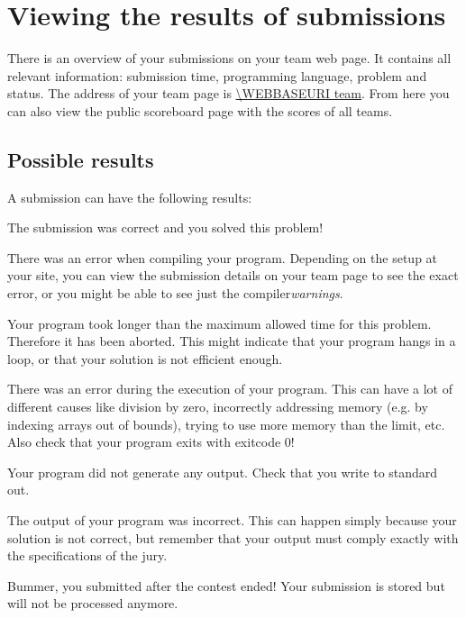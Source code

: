 \section{Viewing the results of submissions}

There is an overview of your submissions on your team web page.
It contains all relevant information: submission time, programming
language, problem and status. The address of your team page is
\url{\WEBBASEURI team}. From here you can also view the public
scoreboard page with the scores of all teams.

\subsection{Possible results}

A submission can have the following results:

\begin{description}[\setleftmargin{4.5cm}]
\item[CORRECT]
The submission was correct and you solved this problem!

\item[COMPILER-ERROR]
There was an error when compiling your program. Depending on the setup
at your site, you can view the submission details on your team page to
see the exact error, or you might be able to see just the
compiler\emph{warnings}.

\item[TIMELIMIT]
Your program took longer than the maximum allowed time for this
problem. Therefore it has been aborted. This might indicate that your
program hangs in a loop, or that your solution is not efficient
enough.

\item[RUN-ERROR]
There was an error during the execution of your program. This can have
a lot of different causes like division by zero, incorrectly
addressing memory (e.g. by indexing arrays out of bounds), trying to
use more memory than the limit, etc. 
Also check that your program exits with exitcode 0!

\item[NO-OUTPUT]
Your program did not generate any output. Check that you write to
standard out.

\item[WRONG-ANSWER]
The output of your program was incorrect. This can happen simply
because your solution is not correct, but remember that your output
must comply exactly with the specifications of the jury.

\item[TOO-LATE]
Bummer, you submitted after the contest ended! Your submission is stored but
will not be processed anymore.
\end{description}

